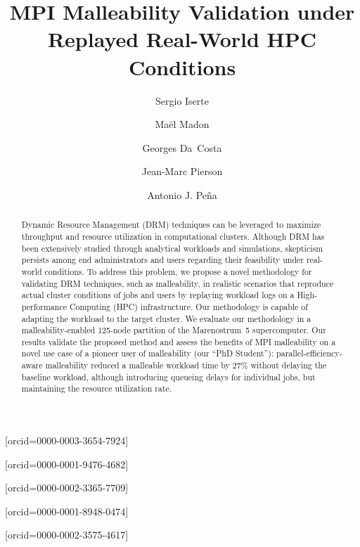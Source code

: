 \documentclass[a4paper,fleqn]{cas-dc}
\begin{document}
\let\WriteBookmarks\relax
\def\floatpagepagefraction{1}
\def\textpagefraction{.001}



\title [mode = title]{MPI Malleability Validation under Replayed Real-World HPC Conditions}


\author[1]{Sergio Iserte}[orcid=0000-0003-3654-7924]
\cormark[1]

\author[2]{Maël Madon}[orcid=0000-0001-9476-4682]
\author[2]{Georges Da~Costa}[orcid=0000-0002-3365-7709]
\author[2]{Jean-Marc Pierson}[orcid=0000-0001-8948-0474]
\author[1]{Antonio J. Peña}[orcid=0000-0002-3575-4617]

            




\begin{abstract}
Dynamic Resource Management (DRM) techniques can be leveraged to maximize throughput and resource utilization in computational clusters.
Although DRM has been extensively studied through analytical workloads and simulations, skepticism persists among end administrators and users regarding their feasibility under real-world conditions.
To address this problem, we propose a novel methodology for validating DRM techniques, such as malleability, in realistic scenarios that reproduce actual cluster conditions of jobs and users by replaying workload logs on a High-performance Computing (HPC) infrastructure.
Our methodology is capable of adapting the workload to the target cluster.
We evaluate our methodology in a malleability-enabled 125-node partition of the Marenostrum~5 supercomputer. Our results validate the proposed method and assess the benefits of MPI malleability on a novel use case of a pioneer user of malleability (our ``PhD Student''): parallel-efficiency-aware malleability reduced a malleable workload time by 27\% without delaying the baseline workload, although introducing queueing delays for individual jobs, but maintaining the resource utilization rate.
\end{abstract}
\end{document}
